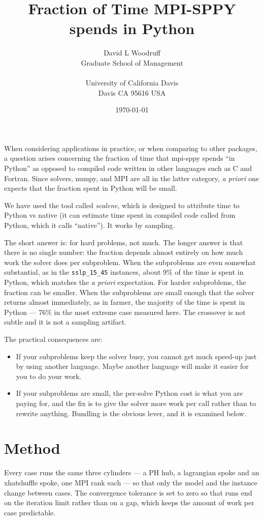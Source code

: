 \documentclass{article}
\title{Fraction of Time MPI-SPPY spends in Python}
\author{ David L Woodruff\\
  Graduate School of Management\\
  \\
  University of California Davis\\
  Davis CA 95616 USA}
\date{\today}
\begin{document}
\maketitle

When considering applications in practice, or when comparing to other
packages, a question arises concerning the fraction of time that
mpi-sppy spends ``in Python'' as opposed to compiled code written in
other languages such as C and Fortran.  Since solvers, numpy, and MPI
are all in the latter category, {\em a priori} one expects that the
fraction spent in Python will be small.

We have used the tool called {\em scalene}, which is designed to
attribute time to Python vs native (it can estimate time spent in
compiled code called from Python, which it calls ``native''). It works
by sampling.

The short answer is: for hard problems, not much.
The longer answer is that there is no single number: the fraction
depends almost entirely on how much work the solver does per
subproblem. When the subproblems are even somewhat substantial, as in the
\texttt{sslp\_15\_45} instances, about 9\% of the time is spent in
Python, which matches the {\em a priori} expectation. For harder subproblems,
the fraction can be smaller. When the
subproblems are small enough that the solver returns almost
immediately, as in farmer, the majority of the time is spent in Python
--- 76\% in the most extreme case measured here. The crossover is not
subtle and it is not a sampling artifact.

The practical consequences are:

\begin{itemize}
  \item If your subproblems keep the solver busy, you cannot get much
    speed-up just by using another language. Maybe another language
    will make it easier for you to do your work.
  \item If your subproblems are small, the per-solve Python cost is
    what you are paying for, and the fix is to give the solver more
    work per call rather than to rewrite anything. Bundling is the
    obvious lever, and it is examined below.
\end{itemize}

\section{Method}

Every case runs the same three cylinders --- a PH hub, a lagrangian
spoke and an xhatshuffle spoke, one MPI rank each --- so that only the
model and the instance change between cases. The convergence tolerance
is set to zero so that runs end on the iteration limit rather than on a
gap, which keeps the amount of work per case predictable.
\end{document}

